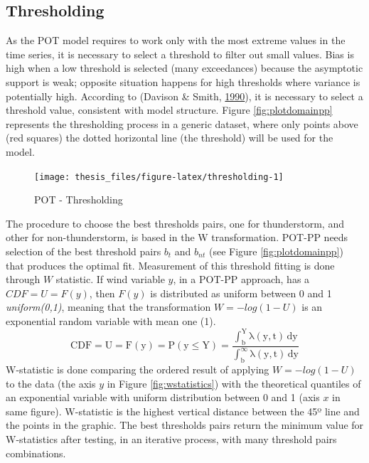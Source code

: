 \documentclass[12pt,twoside]{reedthesis}
\begin{document}
\hypertarget{thresholding}{%
\subsection{Thresholding}\label{thresholding}}

As the POT model requires to work only with the most extreme values in the time series, it is necessary to select a threshold to filter out small values. Bias is high when a low threshold is selected (many exceedances) because the asymptotic support is weak; opposite situation happens for high thresholds where variance is potentially high. According to (Davison \& Smith, \protect\hyperlink{ref-Davison1990}{1990}), it is necessary to select a threshold value, consistent with model structure. Figure \ref{fig:plotdomainpp} represents the thresholding process in a generic dataset, where only points above (red squares) the dotted horizontal line (the threshold) will be used for the model.

\footnotesize
\begin{figure}

{\centering \texttt{[image: thesis\_files/figure-latex/thresholding-1]} 

}

\caption{POT - Thresholding}\label{fig:thresholding}
\end{figure}
\normalsize

The procedure to choose the best thresholds pairs, one for thunderstorm, and other for non-thunderstorm, is based in the W transformation. POT-PP needs selection of the best threshold pairs \(b_t\) and \(b_{nt}\) (see Figure \ref{fig:plotdomainpp}) that produces the optimal fit. Measurement of this threshold fitting is done through \(W\) statistic. If wind variable \(y\), in a POT-PP approach, has a \(CDF = U = F(y)\), then \(F(y)\) is distributed as uniform between 0 and 1 \emph{uniform(0,1)}, meaning that the transformation \(W = -log(1-U)\) is an exponential random variable with mean one (1).
\begin{equation}
  \mathrm{
            CDF = U= F(y) = P(y \leq Y) = \frac{\int_b^Y\lambda(y,t)\,dy}{\int_b^\infty\lambda(y,t)\,dy} 
         }
  \label{eq:ppcdf}
\end{equation}
W-statistic is done comparing the ordered result of applying \(W = -log(1-U)\) to the data (the axis \(y\) in Figure \ref{fig:wstatistics}) with the theoretical quantiles of an exponential variable with uniform distribution between 0 and 1 (axis \(x\) in same figure). W-statistic is the highest vertical distance between the 45º line and the points in the graphic. The best thresholds pairs return the minimum value for W-statistics after testing, in an iterative process, with many threshold pairs combinations.
\end{document}
